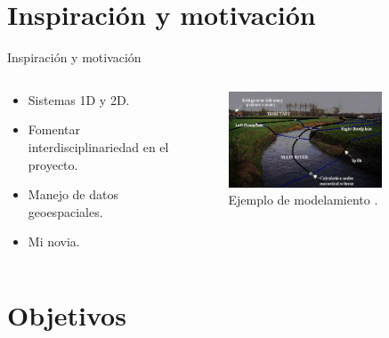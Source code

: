 \documentclass[17pt, t, lualatex]{beamer}
\begin{document}
\section{Inspiración y motivación}

\insertsectionpage

\begin{frame}{Inspiración y motivación}

  \begin{columns}
    \begin{column}{.5\textwidth}
      \begin{itemize}
        \item Sistemas 1D y 2D.
        \item Fomentar interdisciplinariedad en el proyecto.
        \item Manejo de datos geoespaciales.
        \item Mi novia.
      \end{itemize}

      
    \end{column}

    \begin{column}{.5\textwidth}
      \begin{figure}[ht]
        \centering
        \includegraphics[width=0.8\textwidth]{img/2.png}
        \caption{\label{fig:2} Ejemplo de modelamiento \parencite{kuleuven_river_image}.}
      \end{figure}

    \end{column}
  \end{columns}

\end{frame}


\section{Objetivos}
\end{document}
